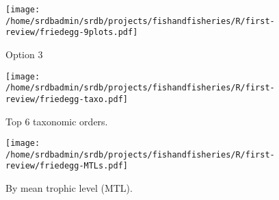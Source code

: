 



\begin{landscape}
\begin{figure}
\begin{center}
\texttt{[image: /home/srdbadmin/srdb/projects/fishandfisheries/R/first-review/friedegg-9plots.pdf]}
\end{center}
\caption{ Option 3}
\end{figure}
\end{landscape}

\begin{figure}
\begin{center}
\texttt{[image: /home/srdbadmin/srdb/projects/fishandfisheries/R/first-review/friedegg-taxo.pdf]}
\end{center}
\caption{Top 6 taxonomic orders. }
\label{fig:taxo}
\end{figure}

\begin{figure}
\begin{center}
\texttt{[image: /home/srdbadmin/srdb/projects/fishandfisheries/R/first-review/friedegg-MTLs.pdf]}
\end{center}
\caption{By mean trophic level (MTL).}
\label{fig:mtl}
\end{figure}





